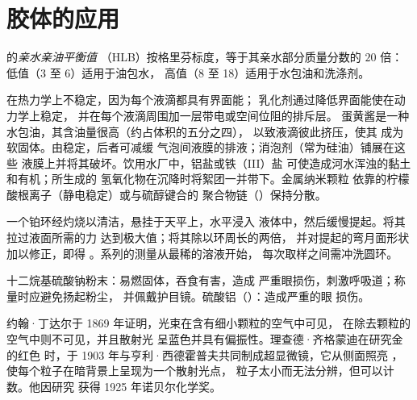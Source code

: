 \section{胶体的应用}

\begin{definition}[亲水亲油平衡值]\label{def:b3:colloids:hlb}
的\emph{亲水亲油平衡值}
（HLB）按格里芬标度，等于其亲水部分质量分数的 $20$ 倍：
低值（3 至 6）适用于油包水，
高值（8 至 18）适用于水包油和洗涤剂。
\end{definition}

在热力学上不稳定，因为每个液滴都具有界面能；
乳化剂通过降低界面能使在动力学上稳定，
并在每个液滴周围加一层带电或空间位阻的排斥层。
蛋黄酱是一种水包油，其含油量很高（约占体积的五分之四），
以致液滴彼此挤压，使其
成为软固体。由稳定，后者可减缓
气泡间液膜的排液；消泡剂（常为硅油）铺展在这些
液膜上并将其破坏。饮用水厂中，铝盐或铁（III）盐
可使造成河水浑浊的黏土和有机；所生成的
氢氧化物在沉降时将絮团一并带下。金属纳米颗粒
依靠的柠檬酸根离子（静电稳定）或与硫醇键合的
聚合物链（）保持分散。

\begin{inthelab}[杜诺伊环]
一个铂环经灼烧以清洁，悬挂于天平上，水平浸入
液体中，然后缓慢提起。将其拉过液面所需的力
达到极大值；将其除以环周长的两倍，
并对提起的弯月面形状加以修正，即得
。系列的测量从最稀的溶液开始，
每次取样之间需冲洗圆环。
\end{inthelab}

\begin{safety}{}
十二烷基硫酸钠粉末：易燃固体，吞食有害，造成
严重眼损伤，刺激呼吸道；称量时应避免扬起粉尘，
并佩戴护目镜。硫酸铝（）：造成严重的眼
损伤。
\end{safety}

\begin{history}[丁达尔与超显微镜]
约翰·丁达尔于 1869 年证明，光束在含有细小颗粒的空气中可见，
在除去颗粒的空气中则不可见，并且散射光
呈蓝色并具有偏振性。理查德·齐格蒙迪在研究金的红色
时，于 1903 年与亨利·西德霍普夫共同制成超显微镜，它从侧面照亮
，使每个粒子在暗背景上呈现为一个散射光点，
粒子太小而无法分辨，但可以计数。他因研究
获得 1925 年诺贝尔化学奖。
\end{history}

